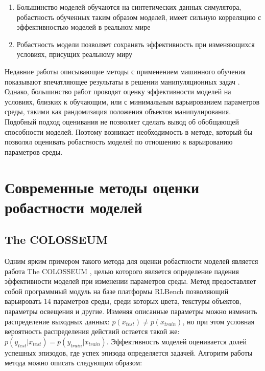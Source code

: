     \begin{enumerate}
        \item Большинство моделей обучаются на синтетических данных симулятора, робастность обученных таким образом моделей, имеет сильную корреляцию с эффективностью моделей в реальном мире
        \item Робастность модели позволяет сохранять эффективность при изменяющихся условиях, присущих реальному миру
    \end{enumerate}
    
    Недавние работы описывающие методы с применением машинного обучения показывают впечатляющее результаты в решении манипуляционных задач \cite{shridhar2022peract, goyal2023rvt, goyal2024rvt2, rt12022arxiv, rt22023arxiv}. Однако, большинство работ проводят оценку эффективности моделей на условиях, близких к обучающим, или с минимальным варьированием параметров среды, такими как рандомизация положения объектов манипулирования. Подобный подход оценивания не позволяет сделать вывод об обобщающей способности моделей. Поэтому возникает необходимость в методе, который бы позволял оценивать робастность моделей по отношению к варьированию параметров среды.

\section{Современные методы оценки робастности моделей}

    \subsection{The COLOSSEUM}

    Одним ярким примером такого метода для оценки робастности моделей является работа The COLOSSEUM \cite{pumacay2024colosseum}, целью которого является определение падения эффективности моделей при изменении параметров среды. Метод предоставляет собой программный модуль на базе платформы RLBench \cite{james2020rlbench} позволяющий варьировать 14 параметров среды, среди которых цвета, текстуры объектов, параметры освещения и другие. Изменяя описанные параметры можно изменить распределение выходных данных: $p(x_{test}) \neq p(x_{train})$, но при этом условная вероятность распределения действий остается такой же: $p(y_{test} | x_{test}) = p(y_{train} | x_{train})$. Эффективность моделей оценивается долей успешных эпизодов, где успех эпизода определяется задачей. Алгоритм работы метода можно описать следующим образом:

